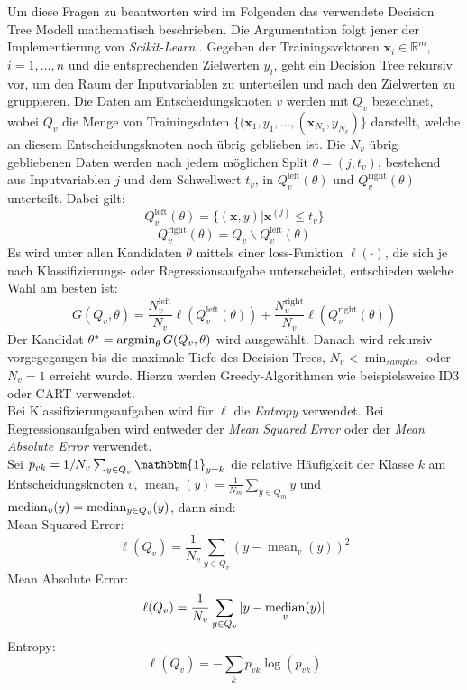 Um diese Fragen zu beantworten wird im Folgenden das verwendete Decision Tree Modell mathematisch beschrieben. Die Argumentation folgt jener der Implementierung von \textit{Scikit-Learn} \cite{sklearn}.
Gegeben der Trainingsvektoren $\mathbf{x}_i \in \mathbb{R}^m$, $i=1,\dots ,n$ und die entsprechenden Zielwerten $y_i$, geht ein Decision Tree rekursiv vor, um den
Raum der Inputvariablen zu unterteilen und nach den Zielwerten zu gruppieren. Die Daten am Entscheidungsknoten $v$ werden mit
$Q_v$ bezeichnet, wobei $Q_v$ die Menge von Trainingsdaten $\{(\mathbf{x}_1, y_1, \dots , (\mathbf{x}_{N_v}, y_{N_v})\}$ darstellt, welche an diesem
Entscheidungsknoten noch \"ubrig geblieben ist. Die $N_v$ \"ubrig
gebliebenen Daten werden nach jedem m\"oglichen
Split $\theta = (j, t_v)$, bestehend aus Inputvariablen $j$ und dem Schwellwert $t_v$, in $Q_v^{\text{left}}(\theta)$ und $Q_v^{\text{right}}(\theta)$ unterteilt. Dabei gilt:
$$ Q_v^{\text{left}}(\theta) = \{ (\mathbf{x},y) | \mathbf{x}^{(j)} \leq t_v \} $$
$$ Q_v^{\text{right}}(\theta) = Q_v \backslash Q_v^{\text{left}}(\theta) $$
Es wird unter allen Kandidaten $\theta$ mittels einer loss-Funktion $\ell(\cdot)$, die sich je nach Klassifizierungs- oder Regressionsaufgabe unterscheidet, entschieden
welche Wahl am besten ist:
$$ G(Q_v, \theta) = \frac{N_v^{\text{left}}}{N_v}\ell(Q_v^{\text{left}}(\theta)) + \frac{N_v^{\text{right}}}{N_v}\ell(Q_v^{\text{right}}(\theta)) $$
Der Kandidat $\theta^* = \operatorname*{argmin}_{\theta}G(Q_v, \theta)$ wird ausgew\"ahlt. Danach wird rekursiv vorgegegangen bis die maximale Tiefe des Decision Trees,
$N_v < \operatorname{min}_{samples}$ oder $N_v = 1$ erreicht wurde. Hierzu werden Greedy-Algorithmen wie beispielsweise ID3 \cite{ID3} oder CART \cite{breiman1984classification} verwendet.\\

Bei Klassifizierungsaufgaben wird f\"ur $\ell$ die \textit{Entropy} verwendet. Bei Regressionsaufgaben wird entweder der \textit{Mean Squared Error} oder
der \textit{Mean Absolute Error} verwendet. \\

Sei $p_{vk} = 1/N_v \sum_{y \in Q_v} \mathbbm{1}_{y = k}$
die relative H\"aufigkeit der Klasse $k$ am Entscheidungsknoten $v$, $\operatorname{mean}_v(y) = \frac{1}{N_m}\sum_{y\in Q_m}y$ und $ \operatorname*{median}_v(y) = \operatorname*{median}_{y \in Q_v}(y)$, dann sind: \\


Mean Squared Error:  $$ \ell(Q_v) = \frac{1}{N_v} \sum_{y\in Q_v} (y - \operatorname{mean}_v(y))^2 $$
Mean Absolute Error: $$ \ell(Q_v) = \frac{1}{N_v} \sum_{y\in Q_v} |y - \operatorname*{median}_v(y)| $$
Entropy: $$ \ell(Q_v) = - \sum_{k} p_{vk}\log(p_{vk}) $$


